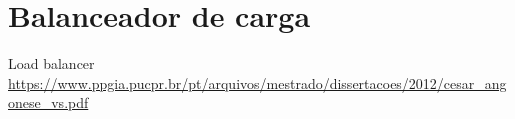 \part{Balanceador de carga}

Load balancer \url{https://www.ppgia.pucpr.br/pt/arquivos/mestrado/dissertacoes/2012/cesar_angonese_vs.pdf}
